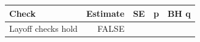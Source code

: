 \begin{tabular}{l
rrrr
}
\toprule
Check & Estimate & SE & p & BH q
\\
\midrule
Layoff checks hold & FALSE &  &  & 
\\
\bottomrule
\end{tabular}

